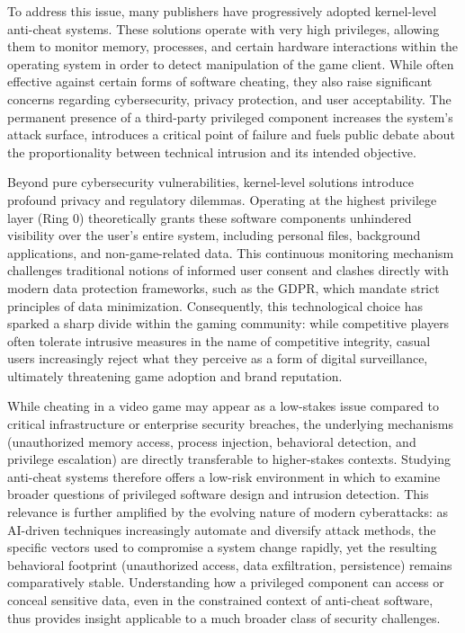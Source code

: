 To address this issue, many publishers have progressively adopted kernel-level anti-\gls{cheat} systems. These solutions operate with very high privileges, allowing them to monitor memory, processes, and certain hardware interactions within the operating system in order to detect manipulation of the game \gls{client}. While often effective against certain forms of software cheating, they also raise significant concerns regarding \gls{cybersecurity}, privacy protection, and user acceptability. The permanent presence of a third-party privileged component increases the system’s attack surface, introduces a critical point of failure and fuels public debate about the proportionality between technical intrusion and its intended objective.

Beyond pure cybersecurity vulnerabilities, \gls{kernel}-level solutions introduce profound privacy and regulatory dilemmas. Operating at the highest privilege layer (Ring 0) theoretically grants these software components unhindered visibility over the user's entire system, including personal files, background applications, and non-game-related data. This continuous monitoring mechanism challenges traditional notions of informed user consent and clashes directly with modern data protection frameworks, such as the GDPR, which mandate strict principles of data minimization. Consequently, this technological choice has sparked a sharp divide within the gaming community: while competitive players often tolerate intrusive measures in the name of competitive integrity, casual users increasingly reject what they perceive as a form of digital surveillance, ultimately threatening game adoption and brand reputation.

While cheating in a video game may appear as a low-stakes issue compared to critical infrastructure or enterprise security breaches, the underlying mechanisms (unauthorized memory access, process injection, behavioral detection, and privilege escalation) are directly transferable to higher-stakes contexts. Studying anti-cheat systems therefore offers a low-risk environment in which to examine broader questions of privileged software design and intrusion detection. This relevance is further amplified by the evolving nature of modern cyberattacks: as AI-driven techniques increasingly automate and diversify attack methods, the specific vectors used to compromise a system change rapidly, yet the resulting behavioral footprint (unauthorized access, data exfiltration, persistence) remains comparatively stable. Understanding how a privileged component can access or conceal sensitive data, even in the constrained context of anti-cheat software, thus provides insight applicable to a much broader class of security challenges.

